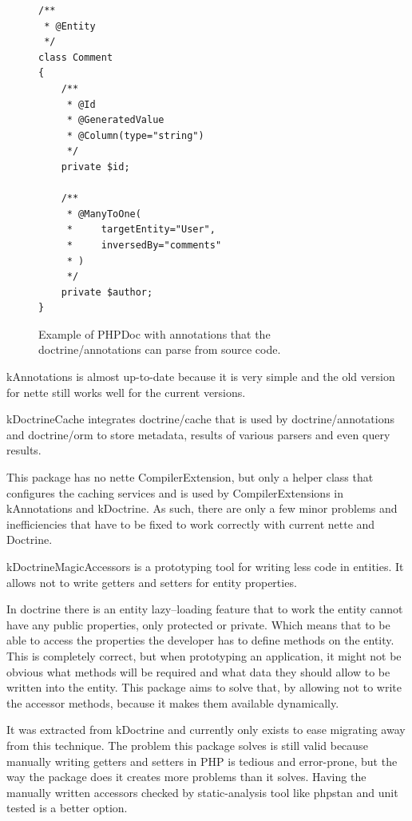 \begin{figure} \label{fig:php:annotations-example}
\begin{lstlisting}
/**
 * @Entity
 */
class Comment
{
    /**
     * @Id
     * @GeneratedValue
     * @Column(type="string")
     */
    private $id;

    /**
     * @ManyToOne(
     *     targetEntity="User",
     *     inversedBy="comments"
     * )
     */
    private $author;
}
\end{lstlisting}
\caption{Example of PHPDoc with annotations that the doctrine/annotations can parse from source code.}
\end{figure}

\gls{kAnnotations} is almost up-to-date because it is very simple and the old version for \gls{nette} still works well for the current versions.

 \label{sec:state:doctrine-cache}

\gls{kDoctrineCache} integrates doctrine/cache that is used by doctrine/annotations and doctrine/orm to store metadata, results of various parsers and even query results.

This package has no \gls{nette} CompilerExtension, but only a helper class that configures the caching services and is used by CompilerExtensions in \gls{kAnnotations} and \gls{kDoctrine}. As such, there are only a few minor problems and inefficiencies that have to be fixed to work correctly with current \gls{nette} and Doctrine.

 \label{sec:state:doctrine-magic-accessors}

\gls{kDoctrineMagicAccessors} is a prototyping tool for writing less code in entities. It allows not to write getters and setters for entity properties.

In \gls{doctrine} there is an entity lazy--loading feature that to work the entity cannot have any public properties, only protected or private. Which means that to be able to access the properties the developer has to define methods on the entity. This is completely correct, but when prototyping an application, it might not be obvious what methods will be required and what data they should allow to be written into the entity. This package aims to solve that, by allowing not to write the accessor methods, because it makes them available dynamically.

It was extracted from \gls{kDoctrine} and currently only exists to ease migrating away from this technique. The problem this package solves is still valid because manually writing getters and setters in PHP is tedious and error-prone, but the way the package does it creates more problems than it solves. Having the manually written accessors checked by static-analysis tool like \gls{phpstan} and unit tested is a better option.

